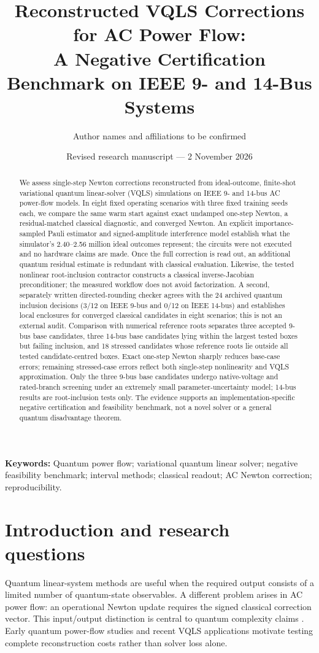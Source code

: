 \documentclass[11pt,a4paper]{article}
\title{\bfseries Reconstructed VQLS Corrections for AC Power Flow:\\ A Negative Certification Benchmark on IEEE 9- and 14-Bus Systems}
\author{Author names and affiliations to be confirmed}
\date{Revised research manuscript --- 2 November 2026}
\theoremstyle{remark}\newtheorem{remark}[theorem]{Remark}
\begin{document}
\maketitle
\begin{abstract}
We assess single-step Newton corrections reconstructed from ideal-outcome, finite-shot variational quantum linear-solver (VQLS) simulations on IEEE 9- and 14-bus AC power-flow models. In eight fixed operating scenarios with three fixed training seeds each, we compare the same warm start against exact undamped one-step Newton, a residual-matched classical diagnostic, and converged Newton. An explicit importance-sampled Pauli estimator and signed-amplitude interference model establish what the simulator's 2.40--2.56 million ideal outcomes represent; the circuits were not executed and no hardware claims are made. Once the full correction is read out, an additional quantum residual estimate is redundant with classical evaluation. Likewise, the tested nonlinear root-inclusion contractor constructs a classical inverse-Jacobian preconditioner; the measured workflow does not avoid factorization. A second, separately written directed-rounding checker agrees with the 24 archived quantum inclusion decisions (3/12 on IEEE 9-bus and 0/12 on IEEE 14-bus) and establishes local enclosures for converged classical candidates in eight scenarios; this is not an external audit. Comparison with numerical reference roots separates three accepted 9-bus base candidates, three 14-bus base candidates lying within the largest tested boxes but failing inclusion, and 18 stressed candidates whose reference roots lie outside all tested candidate-centred boxes. Exact one-step Newton sharply reduces base-case errors; remaining stressed-case errors reflect both single-step nonlinearity and VQLS approximation. Only the three 9-bus base candidates undergo native-voltage and rated-branch screening under an extremely small parameter-uncertainty model; 14-bus results are root-inclusion tests only. The evidence supports an implementation-specific negative certification and feasibility benchmark, not a novel solver or a general quantum disadvantage theorem.
\end{abstract}
\noindent\textbf{Keywords:} Quantum power flow; variational quantum linear solver; negative feasibility benchmark; interval methods; classical readout; AC Newton correction; reproducibility.

\section{Introduction and research questions}
Quantum linear-system methods are useful when the required output consists of a limited number of quantum-state observables. A different problem arises in AC power flow: an operational Newton update requires the signed classical correction vector. This input/output distinction is central to quantum complexity claims \citep{hhl2009,aaronson2015,pareek2026}. Early quantum power-flow studies \citep{feng2021,feng2023} and recent VQLS applications \citep{feng2025,ninlawat2026} motivate testing complete reconstruction costs rather than solver loss alone.
\end{document}
